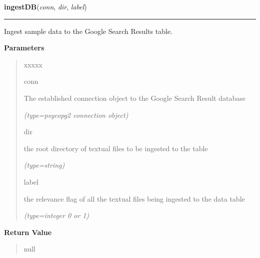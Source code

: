 \hspace{.8\funcindent}\begin{boxedminipage}{\funcwidth}

    \raggedright \textbf{ingestDB}(\textit{conn}, \textit{dir}, \textit{label})

    \vspace{-1.5ex}

    \rule{\textwidth}{0.5\fboxrule}
\setlength{\parskip}{2ex}
    Ingest sample data to the Google Search Results table.

\setlength{\parskip}{1ex}
      \textbf{Parameters}
      \vspace{-1ex}

      \begin{quote}
        \begin{Ventry}{xxxxx}

          \item[conn]

          The established connection object to the Google Search Result 
          database

            {\it (type=psycopg2 connection object)}

          \item[dir]

          the root directory of textual files to be ingested to the table

            {\it (type=string)}

          \item[label]

          the relevance flag of all the textual files being ingested to the
          data table

            {\it (type=integer 0 or 1)}

        \end{Ventry}

      \end{quote}

      \textbf{Return Value}
    \vspace{-1ex}

      \begin{quote}
      null

      \end{quote}

    \end{boxedminipage}

    \label{db:readDB}

    \vspace{0.5ex}

